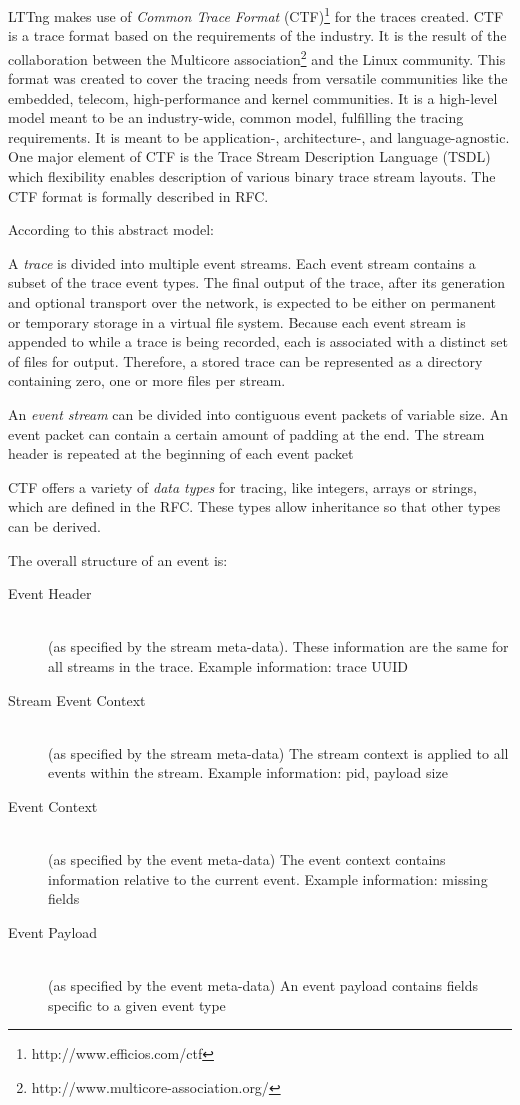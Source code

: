LTTng makes use of \textit{Common Trace Format}
(CTF)\footnote{http://www.efficios.com/ctf} for the traces created. CTF is a
trace format based on the requirements of the industry. It is the result of the
collaboration between the Multicore
association\footnote{http://www.multicore-association.org/} and the Linux
community. This format was created to cover the tracing needs from versatile
communities like the embedded, telecom, high-performance and kernel communities.
It is a  high-level model meant to be an industry-wide, common model, fulfilling
the tracing requirements. It is meant to be application-, architecture-, and
language-agnostic. One major element of CTF is the Trace Stream Description
Language (TSDL) which flexibility enables description of various binary trace
stream layouts. The CTF format is formally described in RFC.

According to this abstract model:

A \textit{trace} is divided into multiple event streams. Each event stream
contains a subset of the trace event types. The final output of the trace, after
its generation and optional transport over the network, is expected to be either
on permanent or temporary storage in a virtual file system. Because each event
stream is appended to while a trace is being recorded, each is associated with a
distinct set of files for output. Therefore, a stored trace can be represented
as a directory containing zero, one or more files per stream.

An \textit{event stream} can be divided into contiguous event packets of
variable size. An event packet can contain a certain amount of padding at the
end. The stream header is repeated at the beginning of each event packet

CTF offers a variety of \textit{data types} for tracing, like integers, arrays
or strings, which are defined in the RFC. Τhese types allow inheritance so
that other types can be derived. 

The overall structure of an event is:

\begin{description}
\item[Event Header] \hfill \\
(as specified by the stream meta-data). These information are the same for all
streams in the trace. Example information: trace UUID
\item[Stream Event Context] \hfill \\ 
(as specified by the stream meta-data) The stream context is applied to all
events within the stream. Example information: pid, payload size
\item[Event Context] \hfill \\
(as specified by the event meta-data) The event context contains information
relative to the current event. Example information: missing fields
\item[Event Payload] \hfill \\
(as specified by the event meta-data) An event payload contains fields specific
to a given event type
\end{description}

